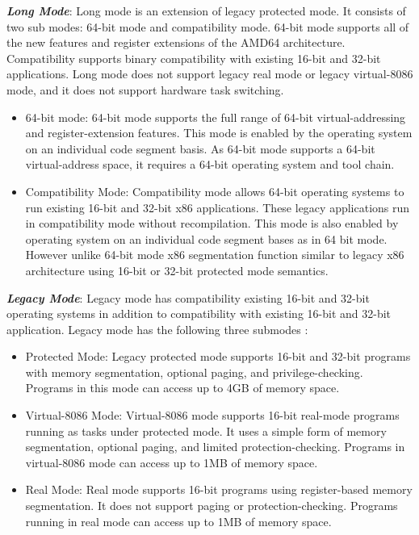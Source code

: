 


\emph {\bf Long Mode}: Long mode is an extension of legacy protected mode. It consists of two sub modes: 64-bit mode and compatibility mode. 64-bit mode supports all of the new features and register extensions of the AMD64 architecture. Compatibility supports binary compatibility with existing 16-bit and 32-bit applications. Long mode does not support legacy real mode or legacy virtual-8086 mode, and it does not support hardware task switching.
\begin{itemize}

\item 64-bit mode: 64-bit mode supports the full range of 64-bit virtual-addressing and register-extension features. This mode is enabled by the operating system on an individual code segment basis. As 64-bit mode supports a 64-bit virtual-address space, it requires a 64-bit operating system and tool chain.


\item Compatibility Mode: Compatibility mode allows 64-bit operating systems to run existing 16-bit and 32-bit x86 applications. These legacy applications run in compatibility mode without recompilation. This mode is also enabled by operating system on an individual code segment bases as in 64 bit mode. However unlike 64-bit mode x86 segmentation function similar to legacy x86 architecture using 16-bit or 32-bit protected mode semantics.

\end{itemize}



\emph {\bf Legacy Mode}: Legacy mode has compatibility existing 16-bit and 32-bit operating systems in addition to compatibility with existing 16-bit and 32-bit application. Legacy mode has the following three submodes : 

\begin{itemize}

\item Protected Mode: Legacy protected mode supports 16-bit and 32-bit programs with memory segmentation, optional paging, and privilege-checking. Programs in this mode can access up to 4GB of memory space.


\item Virtual-8086 Mode: Virtual-8086 mode supports 16-bit real-mode programs running as tasks under protected mode. It uses a simple form of memory segmentation, optional paging, and limited protection-checking. Programs in virtual-8086 mode can access up to 1MB of memory space.


\item Real Mode: Real mode supports 16-bit programs using register-based memory segmentation. It does not support paging or protection-checking. Programs running in real mode can access up to 1MB of memory space.
\end{itemize}

